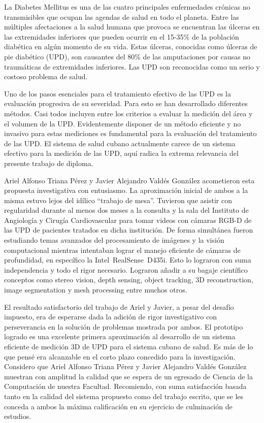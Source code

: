 \begin{opinion}

La Diabetes Mellitus es una de las cuatro principales enfermedades crónicas no transmisibles que ocupan las agendas de salud en todo el planeta. Entre las múltiples afectaciones a la salud humana que provoca se encuentran las úlceras en las extremidades inferiores que pueden ocurrir en el 15-35\% de la población diabética en algún momento de su vida. Estas úlceras, conocidas como úlceras de pie diabético (UPD), son causantes del 80\% de las amputaciones por causas no traumáticas de extremidades inferiores. Las UPD son reconocidas como un serio y costoso problema de salud.
    
Uno de los pasos esenciales para el tratamiento efectivo de las UPD es la evaluación progresiva de su severidad. Para esto se han desarrollado diferentes métodos. Casi todos incluyen entre los criterios a evaluar la medición del área y el volumen de la UPD. Evidentemente disponer de un método eficiente y no invasivo para estas mediciones es fundamental para la evaluación del tratamiento de las UPD. El sistema de salud cubano actualmente carece de un sistema efectivo para la medición de las UPD, aquí radica la extrema relevancia del presente trabajo de diploma. 
    
Ariel Alfonso Triana Pérez y Javier Alejandro Valdés González acometieron esta propuesta investigativa con entusiasmo. La aproximación inicial de ambos a la misma estuvo lejos del idílico \textquotedblleft trabajo de mesa\textquotedblright . Tuvieron que asistir con regularidad durante al menos dos meses a la consulta y la sala del Instituto de Angiología y Cirugía Cardiovascular para tomar videos con cámaras RGB-D de las UPD de pacientes tratados en dicha institución. De forma simultánea fueron estudiando temas avanzados del procesamiento de imágenes y la visión computacional mientras intentaban lograr el manejo eficiente de cámaras de profundidad, en específico la Intel\textregistered~RealSense\texttrademark~D435i. Esto lo lograron con suma independencia y todo el rigor necesario. Lograron añadir a su bagaje científico conceptos como stereo vision, depth sensing, object tracking, 3D reconstruction, image segmentation y mesh processing entre muchos otros.

El resultado satisfactorio del trabajo de Ariel y Javier, a pesar del desafío impuesto, era de esperarse dada la adición de rigor investigativo con perseverancia en la solución de problemas mostrada por ambos. El prototipo logrado es una excelente primera aproximación al desarrollo de un sistema eficiente de medición 3D de UPD para el sistema cubano de salud. Es más de lo que pensé era alcanzable en el corto plazo concedido para la investigación. Considero que Ariel Alfonso Triana Pérez y Javier Alejandro Valdés González muestran con amplitud la calidad que se espera de un egresado de Ciencia de la Computación de nuestra Facultad. Recomiendo, con suma satisfacción basada tanto en la calidad del sistema propuesto como del trabajo escrito, que se les conceda a ambos la máxima calificación en su ejercicio de culminación de estudios.


\end{opinion}

